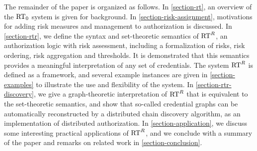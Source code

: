 The remainder of the paper is organized as follows. In
\autoref{section-rt}, an overview of the $\text{RT}_0$ system is given for
background.  In \autoref{section-risk-assignment}, motivations for
adding risk measures and management to authorization is discussed.  In
\autoref{section-rtr}, we define the syntax and set-theoretic
semantics of $\text{RT}^R$, an authorization logic with risk assessment,
including a formalization of risks, risk ordering, risk aggregation
and thresholds.  It is demonstrated that this semantics provides a
meaningful interpretation of any set of credentials.  The system
$\text{RT}^R$ is defined as a framework, and several example instances are
given in \autoref{section-examples} to illustrate the use and
flexibility of the system.  In \autoref{section-rtr-discovery}, we
give a graph-theoretic interpretation of $\text{RT}^R$ that is equivalent to
the set-theoretic semantics, and show that so-called credential graphs
can be automatically reconstructed by a distributed chain discovery
algorithm, as an implementation of distributed authorization.  In
\autoref{section-application}, we discuss some interesting practical
applications of $\text{RT}^R$, and we conclude with a summary of the paper
and remarks on related work in \autoref{section-conclusion}.
